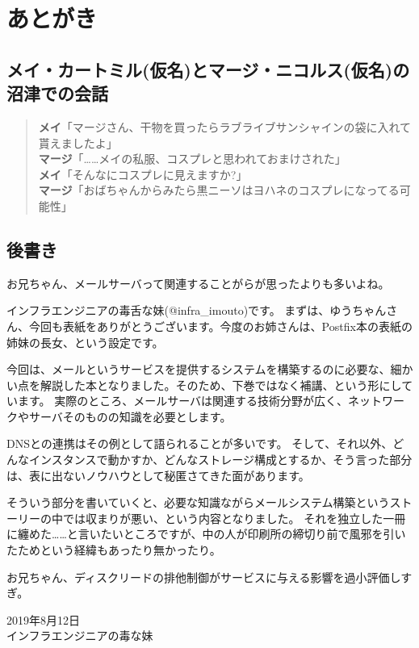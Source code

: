 \chapter{あとがき}

\section*{メイ・カートミル(仮名)とマージ・ニコルス(仮名)の沼津での会話}

\begin{quotation}
\noindent
{\bf メイ}「マージさん、干物を買ったらラブライブサンシャインの袋に入れて貰えましたよ」　\\
{\bf マージ}「……メイの私服、コスプレと思われておまけされた」 \\
{\bf メイ}「そんなにコスプレに見えますか?」 \\
{\bf マージ}「おばちゃんからみたら黒ニーソはヨハネのコスプレになってる可能性」 \\
\end{quotation}


\section*{後書き}

お兄ちゃん、メールサーバって関連することがらが思ったよりも多いよね。

インフラエンジニアの毒舌な妹(@infra\_imouto)です。
まずは、ゆうちゃんさん、今回も表紙をありがとうございます。今度のお姉さんは、Postfix本の表紙の姉妹の長女、という設定です。

今回は、メールというサービスを提供するシステムを構築するのに必要な、細かい点を解説した本となりました。そのため、下巻ではなく補講、という形にしています。
実際のところ、メールサーバは関連する技術分野が広く、ネットワークやサーバそのものの知識を必要とします。

DNSとの連携はその例として語られることが多いです。
そして、それ以外、どんなインスタンスで動かすか、どんなストレージ構成とするか、そう言った部分は、表に出ないノウハウとして秘匿さてきた面があります。

そういう部分を書いていくと、必要な知識ながらメールシステム構築というストーリーの中では収まりが悪い、という内容となりました。
それを独立した一冊に纏めた……と言いたいところですが、中の人が印刷所の締切り前で風邪を引いたためという経緯もあったり無かったり。

お兄ちゃん、ディスクリードの排他制御がサービスに与える影響を過小評価しすぎ。

\begin{flushright}
2019年8月12日 \\
インフラエンジニアの毒な妹 \\
\end{flushright}

